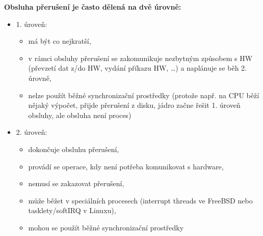 \documentclass[a4paper, 11pt]{article}
\begin{document}
\textbf{Obsluha přerušení je často dělená na dvě úrovně:}
\begin{itemize}
    \item 1. úroveň:
    \begin{itemize}
        \item má být co nejkratší,
        \item v rámci obsluhy přerušení se zakomunikuje nezbytným způsobem s HW (převzetí dat z/do HW, vydání příkazu HW, \ldots) a naplánuje se běh 2. úrovně,
        \item nelze použít běžné synchronizační prostředky (protože např. na CPU běží nějaký výpočet, přijde přerušení z disku, jádro začne řešit 1. úroveň obsluhy, ale obsluha není proces)
    \end{itemize}
    
    \item 2. úroveň:
    \begin{itemize}
        \item dokončuje obsluhu přerušení,
        \item provádí se operace, kdy není potřeba komunikovat s hardware,
        \item nemusí se zakazovat přerušení,
        \item může běžet v speciálních procesech (interrupt threads ve FreeBSD nebo tasklety/softIRQ v Linuxu),
        \item mohou se použít běžné synchronizační prostředky
    \end{itemize}
\end{itemize}
\end{document}
